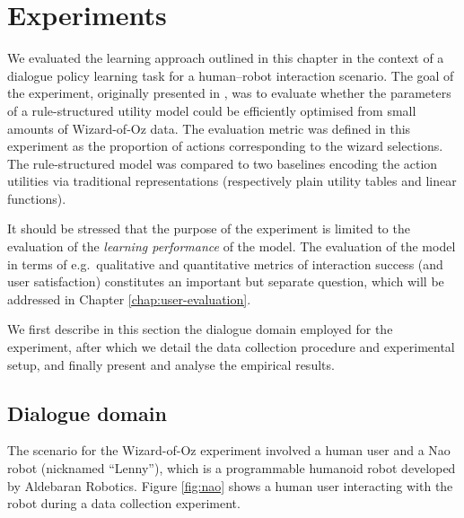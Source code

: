 \section{Experiments}
\label{sec:wozlearning-experiments}

We evaluated the learning approach outlined in this chapter in the context of a dialogue policy learning task for a human--robot interaction scenario.  The goal of the experiment, originally presented in \cite{rulebasedmodels-sigdial2012}, was to evaluate whether the parameters of a rule-structured utility model could be efficiently optimised from small amounts of Wizard-of-Oz data.  The evaluation metric was defined in this experiment as the proportion of actions corresponding to the wizard selections. The rule-structured model was compared to two baselines encoding the action utilities via traditional representations (respectively plain utility tables and linear functions). 


It should be stressed that the purpose of the experiment is limited to the evaluation of the \textit{learning performance} of the model. The evaluation of the model in terms of e.g.\ qualitative and quantitative metrics of interaction success (and user satisfaction) constitutes an important but separate question, which will be addressed in Chapter \ref{chap:user-evaluation}. 

We first describe in this section the dialogue domain employed for the experiment, after which we detail the data collection procedure and experimental setup, and finally present and analyse the empirical results. 

\subsection{Dialogue domain}
\label{sec:wozlearning-experiments-domain}

The scenario for the Wizard-of-Oz experiment involved a human user and a Nao robot (nicknamed ``Lenny''), which is a programmable humanoid robot developed by Aldebaran Robotics. Figure \ref{fig:nao} shows a human user interacting with the robot during a data collection experiment. 


